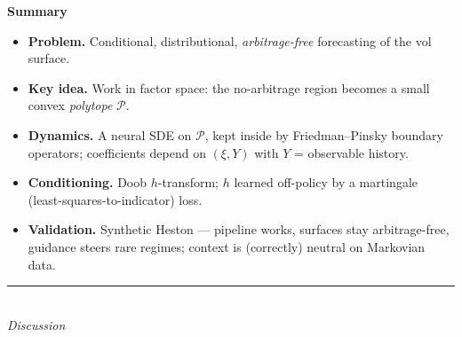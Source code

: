 \documentclass[12pt]{article}
\newcommand{\cP}{\mathcal{P}}
\begin{document}
\thispagestyle{empty}
\vspace*{0.6in}
\begin{center}
{\huge\bfseries Summary}
\end{center}
\vspace{18pt}
\begin{center}
\begin{minipage}{0.9\linewidth}
\large
\begin{itemize}\setlength{\itemsep}{10pt}
\item \textbf{Problem.} Conditional, distributional, \emph{arbitrage-free}
  forecasting of the vol surface.
\item \textbf{Key idea.} Work in factor space: the no-arbitrage region
  becomes a small convex \emph{polytope} $\cP$.
\item \textbf{Dynamics.} A neural SDE on $\cP$, kept inside by
  Friedman--Pinsky boundary operators; coefficients depend on $(\xi,Y)$
  with $Y$ = observable history.
\item \textbf{Conditioning.} Doob $h$-transform; $h$ learned off-policy by a
  martingale (least-squares-to-indicator) loss.
\item \textbf{Validation.} Synthetic Heston --- pipeline works, surfaces
  stay arbitrage-free, guidance steers rare regimes; context is (correctly)
  neutral on Markovian data.
\end{itemize}
\end{minipage}
\end{center}
\vfill
\begin{center}
\rule{0.5\linewidth}{0.4pt}\\[6pt]
{\itshape Discussion}
\end{center}
\vspace*{0.4in}
\end{document}
